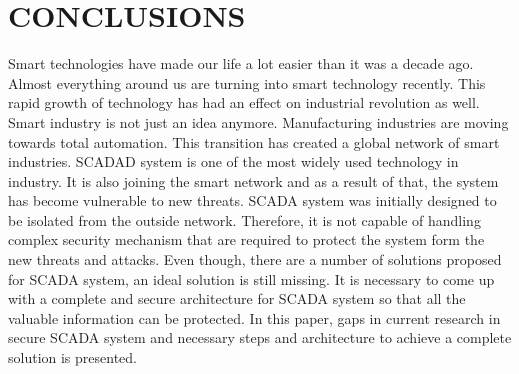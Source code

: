 \documentclass[letterpaper, 10 pt, conference]{ieeeconf}  %
\begin{document}
\section{CONCLUSIONS}
Smart technologies have made our life a lot easier than it was a decade ago. Almost everything around us are turning into smart technology recently. This rapid growth of technology has had an effect on industrial revolution as well. Smart industry is not just an idea anymore. Manufacturing industries are moving towards total automation. This transition has created a global network of smart industries. SCADAD system is one of the most widely used technology in industry. It is also joining the smart network and as a result of that, the system has become vulnerable to new threats. SCADA system was initially designed to be isolated from the outside network. Therefore, it is not capable of handling complex security mechanism that are required to protect the system form the new threats and attacks. Even though, there are a number of solutions proposed for SCADA system, an ideal solution is still missing. It is necessary to come up with a complete and secure architecture for SCADA system so that all the valuable information can be protected. In this paper, gaps in current research in secure SCADA system and necessary steps and architecture to achieve a complete solution is presented.
\addtolength{\textheight}{-12cm}   %











\end{document}
